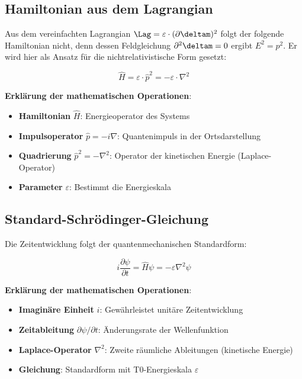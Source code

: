 	\subsection{Hamiltonian aus dem Lagrangian}
	
	Aus dem vereinfachten Lagrangian $\Lag = \varepsilon \cdot (\partial \deltam)^2$ folgt der folgende Hamiltonian nicht, denn dessen Feldgleichung $\partial^2\deltam = 0$ ergibt $E^2 = p^2$. Er wird hier als Ansatz für die nichtrelativistische Form gesetzt:
	
	\begin{equation}
		\hat{H} = \varepsilon \cdot \hat{p}^2 = -\varepsilon \cdot \nabla^2
		\label{eq:simplified_hamiltonian}
	\end{equation}
	
	\textbf{Erklärung der mathematischen Operationen}:
	\begin{itemize}
		\item \textbf{Hamiltonian} $\hat{H}$: Energieoperator des Systems
		\item \textbf{Impulsoperator} $\hat{p} = -i\nabla$: Quantenimpuls in der Ortsdarstellung
		\item \textbf{Quadrierung} $\hat{p}^2 = -\nabla^2$: Operator der kinetischen Energie (Laplace-Operator)
		\item \textbf{Parameter} $\varepsilon$: Bestimmt die Energieskala
	\end{itemize}
	
	\subsection{Standard-Schrödinger-Gleichung}
	
	Die Zeitentwicklung folgt der quantenmechanischen Standardform:
	
	\begin{equation}
		i\frac{\partial\psi}{\partial t} = \hat{H}\psi = -\varepsilon \nabla^2 \psi
		\label{eq:standard_schrodinger_t0}
	\end{equation}
	
	\textbf{Erklärung der mathematischen Operationen}:
	\begin{itemize}
		\item \textbf{Imaginäre Einheit} $i$: Gewährleistet unitäre Zeitentwicklung
		\item \textbf{Zeitableitung} $\partial\psi/\partial t$: Änderungsrate der Wellenfunktion
		\item \textbf{Laplace-Operator} $\nabla^2$: Zweite räumliche Ableitungen (kinetische Energie)
		\item \textbf{Gleichung}: Standardform mit T0-Energieskala $\varepsilon$
	\end{itemize}
	
